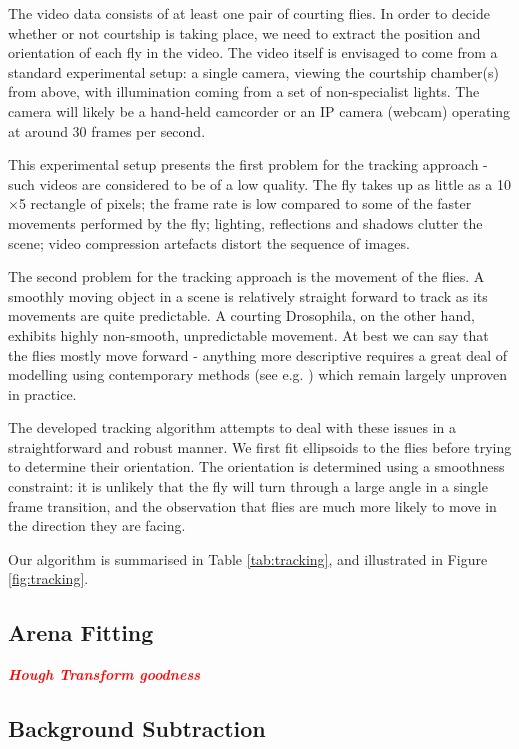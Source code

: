 \documentclass{article}
\newcommand{\todo}[1]{\textsf{\emph{\textbf{\textcolor{red}{#1}}}}}
\begin{document}
The video data consists of at least one pair of courting flies. In order to decide whether or not courtship is taking place, we need to extract the position and orientation of each fly in the video. The video itself is envisaged to come from a standard experimental setup: a single camera, viewing the courtship chamber(s) from above, with illumination coming from a set of non-specialist lights. The camera will likely be a hand-held camcorder or an IP camera (webcam) operating at around 30 frames per second. 

This experimental setup presents the first problem for the tracking approach - such videos are considered to be of a low quality. The fly takes up as little as a 10$\times$5 rectangle of pixels; the frame rate is low compared to some of the faster movements performed by the fly; lighting, reflections and shadows clutter the scene; video compression artefacts distort the sequence of images. 

The second problem for the tracking approach is the movement of the flies. A smoothly moving object in a scene is relatively straight forward to track as its movements are quite predictable. A courting Drosophila, on the other hand, exhibits highly non-smooth, unpredictable movement. At best we can say that the flies mostly move forward - anything more descriptive requires a great deal of modelling using contemporary methods (see e.g. \cite{Oh}) which remain largely unproven in practice.

The developed tracking algorithm attempts to deal with these issues in a straightforward and robust manner. We first fit ellipsoids to the flies before trying to determine their orientation. The orientation is determined using a smoothness constraint: it is unlikely that the fly will turn through a large angle in a single frame transition, and the observation that flies are much more likely to move in the direction they are facing.

Our algorithm is summarised in Table \ref{tab:tracking}, and illustrated in Figure \ref{fig:tracking}.

\subsection{Arena Fitting}

\todo{Hough Transform goodness}

\subsection{Background Subtraction}
\end{document}
